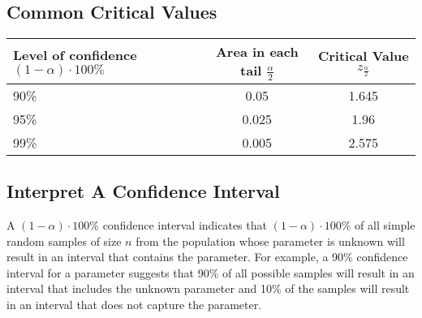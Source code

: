 \documentclass{report}
\begin{document}
        \bigbreak \noindent \bigbreak \noindent 
        \subsection*{Common Critical Values}
        \bigbreak \noindent 
                \begin{center}
            \begin{tabular}{|l|c|c|}
            \hline
            Level of confidence $(1-\alpha) \cdot 100\%$ & Area in each tail $\frac{\alpha}{2}$ & Critical Value $z_{\frac{\alpha}{2}}$ \\
            	\hline
            90\% & 0.05 & 1.645   \\
            	\hline
            95\% & 0.025 & 1.96 \\
            \hline 
            99\% & 0.005 & 2.575 \\
            \hline
            \end{tabular}
        \end{center}

        \bigbreak \noindent \bigbreak \noindent 
        \subsection*{Interpret A Confidence Interval }
        \bigbreak \noindent 
        \bigbreak \noindent 
        A $(1-\alpha)\cdot 100\%$ confidence interval indicates that $(1-\alpha)\cdot 100\%$ of all simple random samples of size $n$ from the population whose parameter is unknown will result in an interval that contains the parameter.
        \bigbreak \noindent 
        For example, a 90\% confidence interval for a parameter suggests that 90\% of all possible samples will result in an interval that includes the unknown parameter and 10\% of the samples will result in an interval that does not capture the parameter.

        \bigbreak \noindent \bigbreak \noindent 
\end{document}
